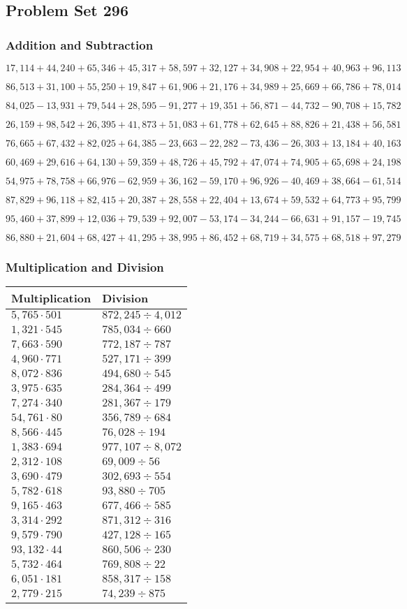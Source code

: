 \hypertarget{problem-set-296}{%
\subsection{Problem Set 296}\label{problem-set-296}}

\hypertarget{addition-and-subtraction}{%
\subsubsection{Addition and
Subtraction}\label{addition-and-subtraction}}

\(17,114+44,240+65,346+45,317+58,597+32,127+34,908+22,954+40,963+96,113\)

\(86,513+31,100+55,250+19,847+61,906+21,176+34,989+25,669+66,786+78,014\)

\(84,025-13,931+79,544+28,595-91,277+19,351+56,871-44,732-90,708+15,782\)

\(26,159+98,542+26,395+41,873+51,083+61,778+62,645+88,826+21,438+56,581\)

\(76,665+67,432+82,025+64,385-23,663-22,282-73,436-26,303+13,184+40,163\)

\(60,469+29,616+64,130+59,359+48,726+45,792+47,074+74,905+65,698+24,198\)

\(54,975+78,758+66,976-62,959+36,162-59,170+96,926-40,469+38,664-61,514\)

\(87,829+96,118+82,415+20,387+28,558+22,404+13,674+59,532+64,773+95,799\)

\(95,460+37,899+12,036+79,539+92,007-53,174-34,244-66,631+91,157-19,745\)

\(86,880+21,604+68,427+41,295+38,995+86,452+68,719+34,575+68,518+97,279\)

\hypertarget{multiplication-and-division}{%
\subsubsection{Multiplication and
Division}\label{multiplication-and-division}}

\begin{longtable}[]{@{}ll@{}}
\toprule
Multiplication & Division\tabularnewline
\midrule
\endhead
\(5,765\cdot501\) & \(872,245÷4,012\)\tabularnewline
\(1,321\cdot545\) & \(785,034÷660\)\tabularnewline
\(7,663\cdot590\) & \(772,187÷787\)\tabularnewline
\(4,960\cdot771\) & \(527,171÷399\)\tabularnewline
\(8,072\cdot836\) & \(494,680÷545\)\tabularnewline
\(3,975\cdot635\) & \(284,364÷499\)\tabularnewline
\(7,274\cdot340\) & \(281,367÷179\)\tabularnewline
\(54,761\cdot80\) & \(356,789÷684\)\tabularnewline
\(8,566\cdot445\) & \(76,028÷194\)\tabularnewline
\(1,383\cdot694\) & \(977,107÷8,072\)\tabularnewline
\(2,312\cdot108\) & \(69,009÷56\)\tabularnewline
\(3,690\cdot479\) & \(302,693÷554\)\tabularnewline
\(5,782\cdot618\) & \(93,880÷705\)\tabularnewline
\(9,165\cdot463\) & \(677,466÷585\)\tabularnewline
\(3,314\cdot292\) & \(871,312÷316\)\tabularnewline
\(9,579\cdot790\) & \(427,128÷165\)\tabularnewline
\(93,132\cdot44\) & \(860,506÷230\)\tabularnewline
\(5,732\cdot464\) & \(769,808÷22\)\tabularnewline
\(6,051\cdot181\) & \(858,317÷158\)\tabularnewline
\(2,779\cdot215\) & \(74,239÷875\)\tabularnewline
\bottomrule
\end{longtable}

